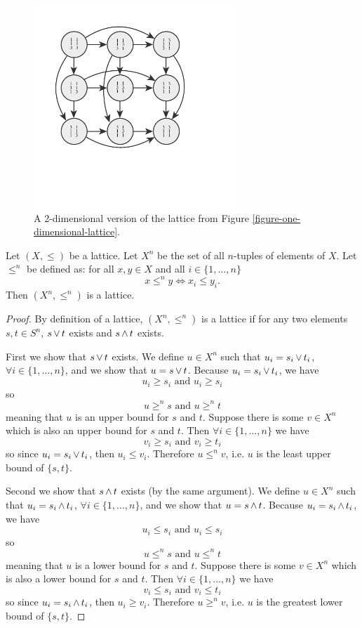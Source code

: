 	\begin{figure}[ht]
		\begin{center}
			\includegraphics[width=3in]{../figures/diagram6.pdf}
			\caption{A 2-dimensional version of the lattice from Figure \ref{figure-one-dimensional-lattice}.}
			\label{figure-two-dimensional-lattice}
		\end{center}
	\end{figure}

	\begin{proposition}
		\label{proposition-grid-is-lattice}
		Let $(X, \le)$ be a lattice. Let $X^n$ be the set of all $n$-tuples of elements of $X$. Let $\le^n$ be defined as: for all $x, y \in X$ and all $i \in \{1, \ldots, n\}$
		\[
			x \le^n y \iff x_i \le y_i.
		\]
		Then $(X^n, \le^n)$ is a lattice.
	\end{proposition}

	\begin{proof}
		By definition of a lattice, $(X^n, \le^n)$ is a lattice if for any two elements $s, t \in S^n$, $s \operatorname{\vee} t$ exists and $s \operatorname{\wedge} t$ exists.

		First we show that $s \operatorname{\vee} t$ exists. We define $u \in X^n$ such that $u_i = s_i \operatorname{\vee} t_i$, $\forall i \in \{1, \ldots, n\}$, and we show that $u = s \operatorname{\vee} t$. Because $u_i = s_i \operatorname{\vee} t_i$, we have
		\[
			u_i \ge s_i \textrm{ and } u_i \ge s_i
		\]
		so
		\[
			u \ge^n s \textrm{ and } u \ge^n t
		\]
		meaning that $u$ is an upper bound for $s$ and $t$. Suppose there is some $v \in X^n$ which is also an upper bound for $s$ and $t$. Then $\forall i \in \{1, \ldots, n\}$ we have
		\[
			v_i \ge s_i \textrm{ and } v_i \ge t_i
		\]
		so since $u_i = s_i \operatorname{\vee} t_i$, then $u_i \le v_i$. Therefore $u \le^n v$, i.e. $u$ is the least upper bound of $\{s, t\}$.

		Second we show that $s \operatorname{\wedge} t$ exists (by the same argument). We define $u \in X^n$ such that $u_i = s_i \operatorname{\wedge} t_i$, $\forall i \in \{1, \ldots, n\}$, and we show that $u = s \operatorname{\wedge} t$. Because $u_i = s_i \operatorname{\wedge} t_i$, we have
		\[
			u_i \le s_i \textrm{ and } u_i \le s_i
		\]
		so
		\[
			u \le^n s \textrm{ and } u \le^n t
		\]
		meaning that $u$ is a lower bound for $s$ and $t$. Suppose there is some $v \in X^n$ which is also a lower bound for $s$ and $t$. Then $\forall i \in \{1, \ldots, n\}$ we have
		\[
			v_i \le s_i \textrm{ and } v_i \le t_i
		\]
		so since $u_i = s_i \operatorname{\wedge} t_i$, then $u_i \ge v_i$. Therefore $u \ge^n v$, i.e. $u$ is the greatest lower bound of $\{s, t\}$.
	\end{proof}
